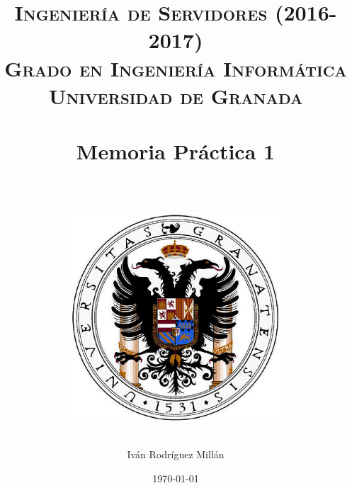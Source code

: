 


\title{	
\normalfont \normalsize 
\textsc{\textbf{Ingeniería de Servidores (2016-2017)} \\ Grado en Ingeniería Informática \\ Universidad de Granada} \\ [25pt] %
\horrule{0.5pt} \\[0.4cm] %
\huge Memoria Práctica 1 \\ %
\horrule{2pt} \\[0.5cm] %
\begin{figure}[!ht]
	\begin{center}
		\includegraphics[width=0.7\textwidth]{imagenes/escudo-de-la-universidad-de-granada}
	\end{center}
\end{figure}
}

\author{Iván Rodríguez Millán} %

\date{\normalsize\today} %





